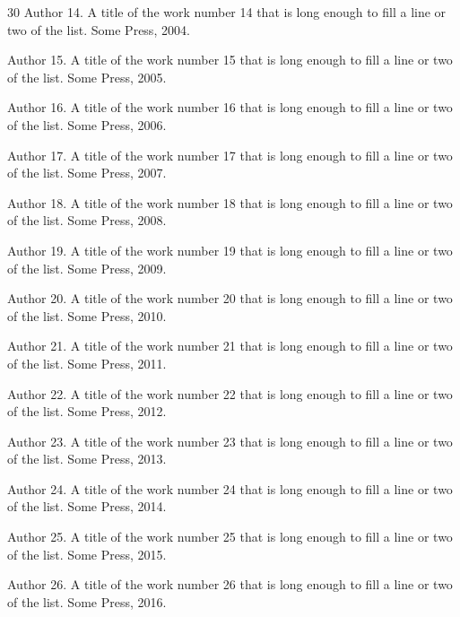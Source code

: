 \documentclass{article}
\begin{document}
\begin{thebibliography}{30}
Author 14.
\newblock A title of the work number 14 that is long enough to fill a line or two of the list.
\newblock Some Press, 2004.

Author 15.
\newblock A title of the work number 15 that is long enough to fill a line or two of the list.
\newblock Some Press, 2005.

Author 16.
\newblock A title of the work number 16 that is long enough to fill a line or two of the list.
\newblock Some Press, 2006.

Author 17.
\newblock A title of the work number 17 that is long enough to fill a line or two of the list.
\newblock Some Press, 2007.

Author 18.
\newblock A title of the work number 18 that is long enough to fill a line or two of the list.
\newblock Some Press, 2008.

Author 19.
\newblock A title of the work number 19 that is long enough to fill a line or two of the list.
\newblock Some Press, 2009.

Author 20.
\newblock A title of the work number 20 that is long enough to fill a line or two of the list.
\newblock Some Press, 2010.

Author 21.
\newblock A title of the work number 21 that is long enough to fill a line or two of the list.
\newblock Some Press, 2011.

Author 22.
\newblock A title of the work number 22 that is long enough to fill a line or two of the list.
\newblock Some Press, 2012.

Author 23.
\newblock A title of the work number 23 that is long enough to fill a line or two of the list.
\newblock Some Press, 2013.

Author 24.
\newblock A title of the work number 24 that is long enough to fill a line or two of the list.
\newblock Some Press, 2014.

Author 25.
\newblock A title of the work number 25 that is long enough to fill a line or two of the list.
\newblock Some Press, 2015.

Author 26.
\newblock A title of the work number 26 that is long enough to fill a line or two of the list.
\newblock Some Press, 2016.


\end{thebibliography}
\end{document}
